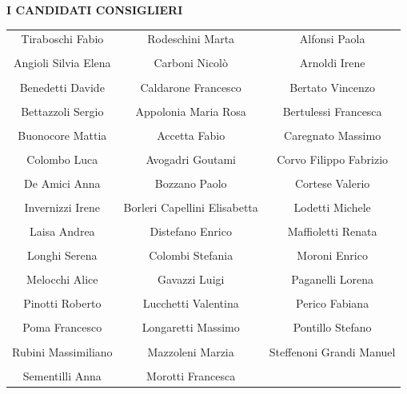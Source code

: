 \onecolumn
\thispagestyle{empty}
\begin{center}\chaptithuge\bfseries
  I CANDIDATI CONSIGLIERI
\end{center}
{}
\newlength\constabsep
\setlength\constabsep{18pt}
\vfill{}
\begin{center}
  \begin{tabular}{ccc}
    Tiraboschi Fabio
    &
    Rodeschini Marta
    &
    Alfonsi Paola
    \\\\
    Angioli Silvia Elena
    &
    Carboni Nicolò
    &
    Arnoldi Irene
    \\\\
    Benedetti Davide
    &
    Caldarone Francesco
    &
    Bertato Vincenzo
    \\\\
    Bettazzoli Sergio
    &
    Appolonia Maria Rosa
    &
    Bertulessi Francesca
    \\\\
    Buonocore Mattia
    &
    Accetta Fabio
    &
    Caregnato Massimo
    \\\\
    Colombo Luca
    &
    Avogadri Goutami
    &
    Corvo Filippo Fabrizio
    \\\\
    De Amici Anna
    &
    Bozzano Paolo
    &
    Cortese Valerio
    \\\\
    Invernizzi Irene
    &
    Borleri Capellini Elisabetta
    &
    Lodetti Michele
    \\\\
    Laisa Andrea
    &
    Distefano Enrico
    &
    Maffioletti Renata
    \\\\
    Longhi Serena
    &
    Colombi Stefania
    &
    Moroni Enrico
    \\\\
    Melocchi Alice
    &
    Gavazzi Luigi
    &
    Paganelli Lorena
    \\\\
    Pinotti Roberto
    &
    Lucchetti Valentina
    &
    Perico Fabiana
    \\\\
    Poma Francesco
    &
    Longaretti Massimo
    &
    Pontillo Stefano
    \\\\
    Rubini Massimiliano
    &
    Mazzoleni Marzia
    &
    Steffenoni Grandi Manuel
    \\\\
    Sementilli Anna
    &
    Morotti Francesca
    &
    

\end{tabular}
\end{center}
